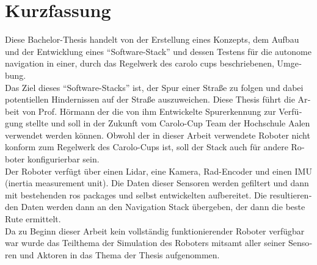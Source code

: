 \chapter*{Kurzfassung}
\label{kurzfassung}

\begin{otherlanguage}{ngerman}

Diese Bachelor-Thesis handelt von der Erstellung eines Konzepts, dem Aufbau und der Entwicklung eines ``Software-Stack'' und dessen Testens für die autonome navigation in einer, durch das Regelwerk des carolo cups beschriebenen, Umgebung.\\

Das Ziel dieses ``Software-Stacks'' ist, der Spur einer Straße zu folgen und dabei potentiellen Hindernissen auf der Straße auszuweichen. Diese Thesis führt die Arbeit von Prof. Hörmann der die von ihm Entwickelte Spurerkennung zur Verfügung stellte und soll in der Zukunft vom Carolo-Cup Team der Hochschule Aalen verwendet werden können. Obwohl der in dieser Arbeit verwendete Roboter nicht konform zum Regelwerk des Carolo-Cups ist, soll der Stack auch für andere Roboter konfigurierbar sein.\\

Der Roboter verfügt über einen Lidar, eine Kamera, Rad-Encoder und einen IMU (inertia measurement unit). Die Daten dieser Sensoren werden gefiltert und dann mit bestehenden ros packages und selbst entwickelten aufbereitet. Die resultierenden Daten werden dann an den Navigation Stack  übergeben, der dann die beste Rute ermittelt.\\

Da zu Beginn dieser Arbeit kein vollständig funktionierender Roboter verfügbar war wurde das Teilthema der Simulation des Roboters mitsamt aller seiner Sensoren und Aktoren in das Thema der Thesis aufgenommen.

\end{otherlanguage}
